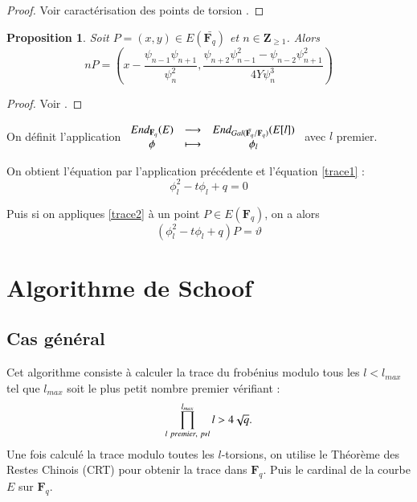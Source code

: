 \documentclass{article}%
\theoremstyle{plain}
\theoremstyle{definition}
\theoremstyle{plain}
\newtheorem{proposition}{Proposition}[section]
\theoremstyle{plain}
\theoremstyle{remark}
\newcommand\fq{\mathbf{F}_{q}}
\begin{document}
\begin{proof}
Voir caractérisation des points de torsion \cite{ref4}. 
\end{proof}

\begin{proposition}
Soit $P=(x,y)\in E(\bar{\fq})$ et $n\in\mathbf{Z}_{\geq 1}$. Alors 
\begin{equation}
nP = \left(x - \dfrac{\psi_{n - 1}\psi_{n + 1}}{\psi_{n}^{2}},\dfrac{\psi_{n + 2}\psi_{n - 1}^{2} - \psi_{n - 2}\psi_{n + 1}^{2}}{4Y\psi_{n}^{3}}\right)
\label{np2}
\end{equation}
\end{proposition}

\begin{proof}
Voir \cite{ref6}.
\end{proof}
  
On définit l'application $
\begin{array}{cl cl}
End_{\fq}(E)&\longrightarrow&End_{Gal(\bar{\fq}/\fq)}(E[l])\\
\phi&\longmapsto&\phi_{l}
\end{array}
$ avec $l$ premier.

On obtient l'équation par l'application précédente et l'équation \eqref{trace1} :
\begin{equation}
\phi_{l}^{2} - t\phi_{l} + q = 0
\label{trace2}
\end{equation}

Puis si on appliques \eqref{trace2} à un point $P\in E(\fq)$, on a alors 
\begin{equation}
(\phi_{l}^{2} - t\phi_{l} + q)P = \vartheta
\label{trace3}
\end{equation}


\section{Algorithme de Schoof}
\subsection{Cas général}

Cet algorithme consiste à calculer la trace du frobénius modulo tous les $l<l_{max}$ tel que $l_{max}$ soit le plus petit nombre premier vérifiant :\begin{equation} 
\prod_{l\ premier,\ p\nshortmid l}^{l_{max}}l > 4\sqrt{q}.
\label{primorielle}
\end{equation}
Une fois calculé la trace modulo toutes les $l$-torsions, on utilise le Théorème des Restes Chinois (CRT) pour obtenir la trace dans $\fq$. Puis le cardinal de la courbe $E$ sur $\fq$.
\end{document}
